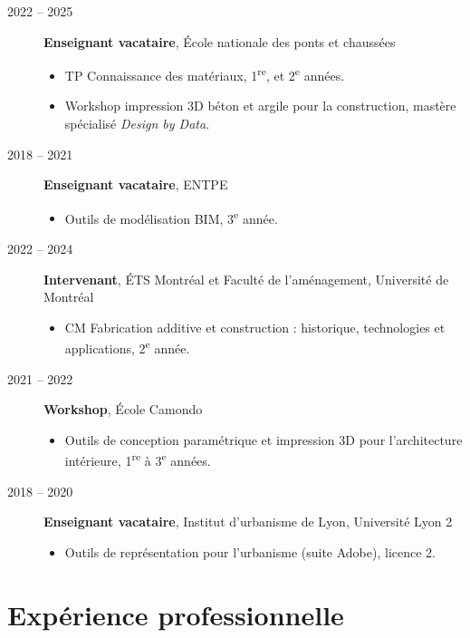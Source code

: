 \documentclass[11pt,a4paper]{article}
\begin{document}
\begin{description}
  \item[2022 -- 2025] \textbf{Enseignant vacataire}, École nationale des ponts et chaussées
  \begin{itemize}
    \item TP Connaissance des matériaux, 1\textsuperscript{re}, et  2\textsuperscript{e} années.
    \item Workshop impression 3D béton et argile pour la construction, mastère spécialisé \emph{Design by Data}.
  \end{itemize}

  \item[2018 -- 2021] \textbf{Enseignant vacataire}, ENTPE
  \begin{itemize}
    \item Outils de modélisation BIM, 3\textsuperscript{e} année.
  \end{itemize}

  \item[2022 -- 2024] \textbf{Intervenant}, ÉTS Montréal et Faculté de l'aménagement, Université de Montréal
  \begin{itemize}
    \item CM Fabrication additive et construction : historique, technologies et applications, 2\textsuperscript{e} année.
  \end{itemize}

  \item[2021 -- 2022] \textbf{Workshop}, École Camondo
  \begin{itemize}
    \item Outils de conception paramétrique et impression 3D pour l'architecture intérieure, 1\textsuperscript{re} à 3\textsuperscript{e} années.
  \end{itemize}

  \item[2018 -- 2020] \textbf{Enseignant vacataire}, Institut d'urbanisme de Lyon, Université Lyon 2
  \begin{itemize}
    \item Outils de représentation pour l'urbanisme (suite Adobe), licence 2.
  \end{itemize}
\end{description}


\section*{Expérience professionnelle}
\end{document}
